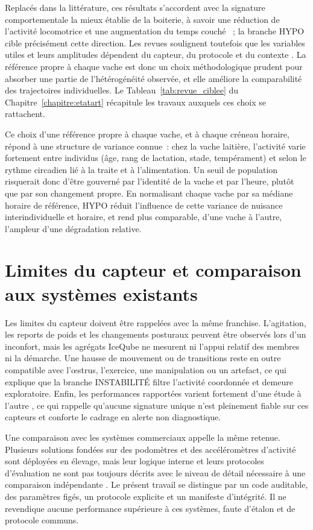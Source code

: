 Replacés dans la littérature, ces résultats s'accordent avec la signature comportementale la
mieux établie de la boiterie, à savoir une réduction de l'activité locomotrice et une
augmentation du temps couché \citep{ito2010lying,blackie2011lying,chapinal2010measurement}~;
la branche HYPO cible précisément cette direction. Les revues soulignent toutefois que les
variables utiles et leurs amplitudes dépendent du capteur, du protocole et du contexte
\citep{oleary2020accelerometers,alsaaod2019automatic}. La référence propre à chaque vache est
donc un choix méthodologique prudent pour absorber une partie de l'hétérogénéité observée, et
elle améliore la comparabilité des trajectoires individuelles. Le
Tableau~\ref{tab:revue_ciblee} du Chapitre~\ref{chapitre:etatart} récapitule les travaux
auxquels ces choix se rattachent.

Ce choix d'une référence propre à chaque vache, et à chaque créneau horaire, répond à une
structure de variance connue~: chez la vache laitière, l'activité varie fortement entre
individus (âge, rang de lactation, stade, tempérament) et selon le rythme circadien lié à la
traite et à l'alimentation. Un seuil de population risquerait donc d'être gouverné par
l'identité de la vache et par l'heure, plutôt que par son changement propre. En normalisant
chaque vache par sa médiane horaire de référence, HYPO réduit l'influence de cette variance
de nuisance interindividuelle et horaire, et rend plus comparable, d'une vache à l'autre,
l'ampleur d'une dégradation relative.

\section{Limites du capteur et comparaison aux systèmes existants}
Les limites du capteur doivent être rappelées avec la même franchise. L'agitation, les reports
de poids et les changements posturaux peuvent être observés lors d'un inconfort, mais les
agrégats IceQube ne mesurent ni l'appui relatif des membres ni la démarche. Une hausse de
mouvement ou de transitions reste en outre compatible avec l'œstrus, l'exercice, une
manipulation ou un artefact, ce qui explique que la branche INSTABILITÉ filtre l'activité
coordonnée et demeure exploratoire. Enfin, les performances rapportées varient fortement d'une
étude à l'autre \citep{oleary2020accelerometers,qiao2021review}, ce qui rappelle qu'aucune
signature unique n'est pleinement fiable sur ces capteurs et conforte le cadrage en alerte non
diagnostique.

Une comparaison avec les systèmes commerciaux appelle la même retenue. Plusieurs solutions
fondées sur des podomètres et des accéléromètres d'activité sont déployées en élevage, mais
leur logique interne et leurs protocoles d'évaluation ne sont pas toujours décrits avec le
niveau de détail nécessaire à une comparaison indépendante
\citep{rutten2013invited,stangaferro2016use}. Le présent travail se distingue par un code
auditable, des paramètres figés, un protocole explicite et un manifeste d'intégrité. Il ne
revendique aucune performance supérieure à ces systèmes, faute d'étalon et de protocole
communs.

